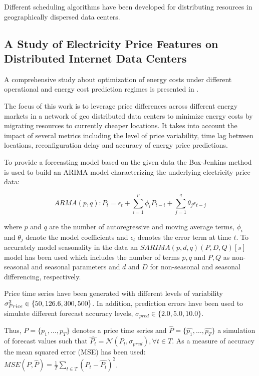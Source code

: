 Different scheduling algorithms have been developed for distributing resources in geographically dispersed data centers. 

\subsection{A Study of Electricity Price Features on Distributed Internet Data Centers}

A comprehensive study about optimization of energy costs under different operational and energy cost prediction regimes is presented in \cite{de2013study}. 

The focus of this work is to leverage price differences across different energy markets in a network of geo distributed data centers to minimize energy costs by migrating resources to currently cheaper locations. It takes into account the impact of several metrics including the level of price variability, time lag between locations, reconfiguration delay and accuracy of energy price predictions. 

To provide a forecasting model based on the given data the Box-Jenkins method is used to build an ARIMA model characterizing the underlying electricity price data:

\[ ARMA(p,q) : P_t = \epsilon_t + \sum_{i=1}^{p}{\phi_i P_{t-i}} + \sum_{j=1}^{q}{\theta_j \epsilon_{t-j}}\] 

where $p$ and $q$ are the number of autoregressive and moving average terms, $\phi_i$ and $\theta_j$ denote the model coefficients and $\epsilon_t$ denotes the error term at time $t$. To accurately model seasonality in the data an $SARIMA(p,d,q)(P,D,Q)[s]$ model has been used which includes the number of terms $p,q$ and $P,Q$ as non-seasonal and seasonal parameters and $d$ and $D$ for non-seasonal and seasonal differencing, respectively. 

Price time series have been generated with different levels of variability $\sigma_{Price}^{2} \in \{50, 126.6, \allowbreak 300, 500\}$. In addition, prediction errors have been used to simulate different forecast accuracy levels, $\sigma_{pred} \in \{2.0, 5.0, 10.0\}$. 

Thus, $P = \{p_1,\ldots,p_T \}$ denotes a price time series and $\hat{P} = \{\hat{p_1},\ldots,\hat{p_T}\}$ a simulation of forecast values such that 
$\hat{P_t} = \mathcal{N}(P_t, \sigma_{pred}), \forall t \in T$. As a measure of accuracy the mean squared error (MSE) has been used: 
$MSE(P,\hat{P}) = \frac{1}{T} \sum_{t \in T}{(P_t - \hat{P_t})^2}$. 


